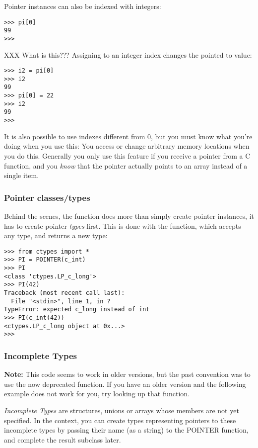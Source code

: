 Pointer instances can also be indexed with integers:
\begin{verbatim}
>>> pi[0]
99
>>>
\end{verbatim}

XXX What is this???
Assigning to an integer index changes the pointed to value:
\begin{verbatim}
>>> i2 = pi[0]
>>> i2
99
>>> pi[0] = 22
>>> i2
99
>>>
\end{verbatim}

It is also possible to use indexes different from 0, but you must know
what you're doing when you use this: You access or change arbitrary
memory locations when you do this. Generally you only use this feature
if you receive a pointer from a C function, and you \emph{know} that the
pointer actually points to an array instead of a single item.


\subsubsection{Pointer classes/types\label{ctypes-pointer-classestypes}}

Behind the scenes, the  function does more than simply
create pointer instances, it has to create pointer \emph{types} first.
This is done with the  function, which accepts any
 type, and returns a new type:
\begin{verbatim}
>>> from ctypes import *
>>> PI = POINTER(c_int)
>>> PI
<class 'ctypes.LP_c_long'>
>>> PI(42)
Traceback (most recent call last):
  File "<stdin>", line 1, in ?
TypeError: expected c_long instead of int
>>> PI(c_int(42))
<ctypes.LP_c_long object at 0x...>
>>>
\end{verbatim}


\subsubsection{Incomplete Types\label{ctypes-incomplete-types}}

\textbf{Note:} This code seems to work in older versions, but the past
convention was to use the now deprecated  function.
If you have an older version and the following example does not work
for you, try looking up that function.

\emph{Incomplete Types} are structures, unions or arrays whose members are
not yet specified. In the  context, you can create types
representing pointers to these incomplete types by passing their name
(as a string) to the POINTER function, and complete the result
subclass later.

